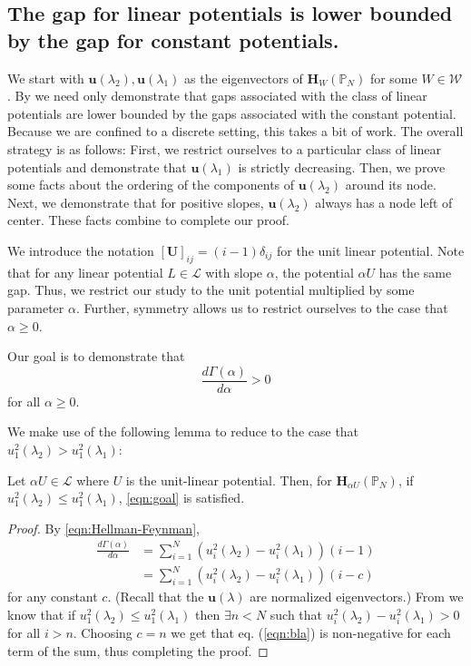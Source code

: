   \subsection{The gap for linear potentials is lower bounded by the gap for constant potentials.}
    We start with $\mathbf{u}(\lambda_2),\mathbf{u}(\lambda_1)$ as the eigenvectors of $\mathbf{H}_{W}(\mathbb{P}_N)$ for some $W \in \mathcal{W}$. By  we need only demonstrate that gaps associated with the class of linear potentials are lower bounded by the gaps associated with the constant potential. Because we are confined to a discrete setting, this takes a bit of work. The overall strategy is as follows: First, we restrict ourselves to a particular class of linear potentials and demonstrate that $\mathbf{u}(\lambda_1)$ is strictly decreasing. Then, we prove some facts about the ordering of the components of $\mathbf{u}(\lambda_2)$ around its node. Next, we demonstrate that for positive slopes, $\mathbf{u}(\lambda_2)$ always has a node left of center. These facts combine to complete our proof.

    We introduce the notation $\left[\mathbf{U}\right]_{ij} = (i-1)\delta_{ij}$ for the unit linear potential. Note that for any linear potential $L \in \mathcal{L}$ with slope $\alpha$, the potential $\alpha U$ has the same gap. Thus, we restrict our study to the unit potential multiplied by some parameter $\alpha$. Further, symmetry allows us to restrict ourselves to the case that $\alpha\geq0$.

    Our goal is to demonstrate that
    \begin{equation}\label{eqn:goal}
    	\frac{d \Gamma(\alpha)}{d \alpha} > 0
    \end{equation}
    for all $\alpha \geq 0$.

    We make use of the following lemma to reduce to the case that $u_1^2(\lambda_2) > u_1^2(\lambda_1)$:
    \begin{lem}\label{lem:simplify}
    	Let $\alpha U\in\mathcal{L}$ where $U$ is the unit-linear potential. Then, for $\mathbf{H}_{\alpha U}(\mathbb{P}_N)$, if $u_1^2(\lambda_2) \leq u_1^2(\lambda_1)$, \cref{eqn:goal} is satisfied.
    \end{lem}

    \begin{proof}
      By \cref{eqn:Hellman-Feynman},
      \begin{align}
      	\frac{d\Gamma(\alpha)}{d \alpha} &= \sum_{i=1}^{N}\left(u_i^2(\lambda_2)-u_i^2(\lambda_1)\right) (i-1)  \\
      	&= \sum_{i=1}^{N}\left(u_i^2(\lambda_2)-u_i^2(\lambda_1)\right) (i - c) \label{eqn:bla}
      \end{align}
      for any constant $c$. (Recall that the $\mathbf{u}(\lambda)$ are normalized eigenvectors.) From  we know that if $u_1^2(\lambda_2) \leq u_1^2(\lambda_1)$ then $\exists n < N$ such that $u_i^2(\lambda_2)-u_i^2(\lambda_1) > 0$ for all $i>n$. Choosing $c = n$ we get that eq. (\ref{eqn:bla}) is non-negative for each term of the sum, thus completing the proof.
    \end{proof}

